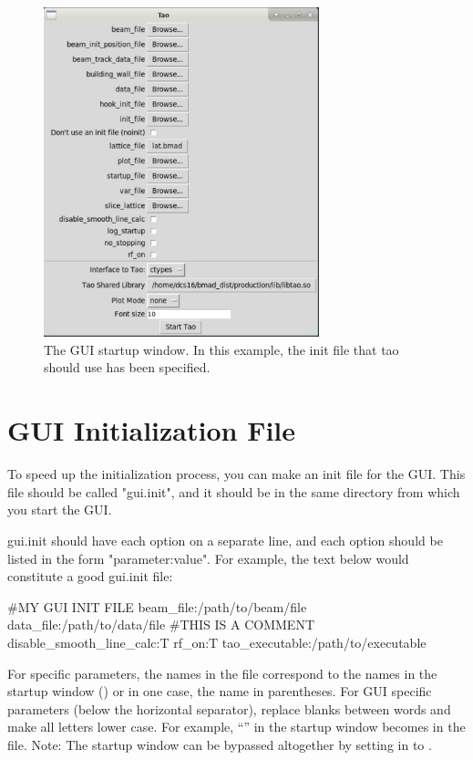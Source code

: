 \begin{figure}
\includegraphics[width=8cm]{figures/startup.pdf}
\centering
\caption[The GUI startup window.]{The GUI startup window. In this example, the init file that tao should use has been specified.}
\label{fig:startup}
\end{figure}

\section{GUI Initialization File}
\label{s:gui.init.file}

To speed up the initialization process, you can make an init file for the GUI.  This file should be called "gui.init", and it should be in the same directory from which you start the GUI.

gui.init should have each option on a separate line, and each option should be listed in the form "parameter:value".  For example, the text below would constitute a good gui.init file:
\begin{example}
  #MY GUI INIT FILE
  beam_file:/path/to/beam/file
  data_file:/path/to/data/file
  #THIS IS A COMMENT
  disable_smooth_line_calc:T
  rf_on:T
  tao_executable:/path/to/executable
\end{example}
For \tao specific parameters, the names in the  file correspond to the names in the startup window
() or in one case, the name in parentheses. For GUI specific parameters (below the horizontal separator), replace blanks between words and
make all letters lower case. For example, ``'' in the startup window becomes 
in the  file. Note: The startup window can be bypassed altogether by setting  in 
to .

